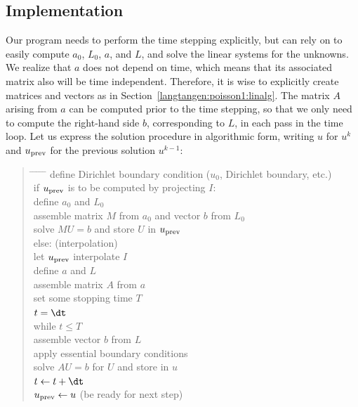 \subsection{Implementation}
\label{langtangen:timedep:diffusion1:impl}

Our program needs to perform the time stepping explicitly, but can
rely on \fenics{} to easily compute $a_0$, $L_0$, $a$, and $L$, and
solve the linear systems for the unknowns.  We realize that $a$ does
not depend on time, which means that its associated matrix also will be
time independent. Therefore, it is wise to explicitly create matrices and
vectors as in Section~\ref{langtangen:poisson1:linalg}.  The matrix $A$
arising from $a$ can be computed prior to the time stepping, so that
we only need to compute the right-hand side $b$, corresponding to $L$,
in each pass in the time loop. Let us express the solution procedure
in algorithmic form, writing $u$ for $u^k$ and $u_{\rm prev}$ for the
previous solution $u^{k-1}$:
\begin{quote}
\begin{tabbing}
\hspace*{0.5cm}\= \hspace{0.5cm} \= \hspace{0.5cm} \=
\hspace{0.5cm} \= \hspace{0.5cm} \= \kill
define Dirichlet boundary condition ($u_0$, Dirichlet boundary, etc.)\\
if $u_{\rm prev}$ is to be computed by projecting $I$:\\
\>define $a_0$ and $L_0$\\
\> assemble matrix $M$ from $a_0$ and vector $b$ from $L_0$\\
\> solve $MU=b$ and store $U$ in $u_{\rm prev}$\\
else:  (interpolation)\\
\> let $u_{\rm prev}$ interpolate $I$\\
define $a$ and $L$\\
assemble matrix $A$ from $a$\\
set some stopping time $T$\\
$t={\dt}$\\
while $t\leqslant T$\\
\> assemble vector $b$ from $L$\\
\> apply essential boundary conditions\\
\> solve $AU=b$ for $U$ and store in $u$\\
\> $t\leftarrow t + {\dt}$\\
\> $u_{\rm prev} \leftarrow u$ (be ready for next step)
\end{tabbing}
\end{quote}

